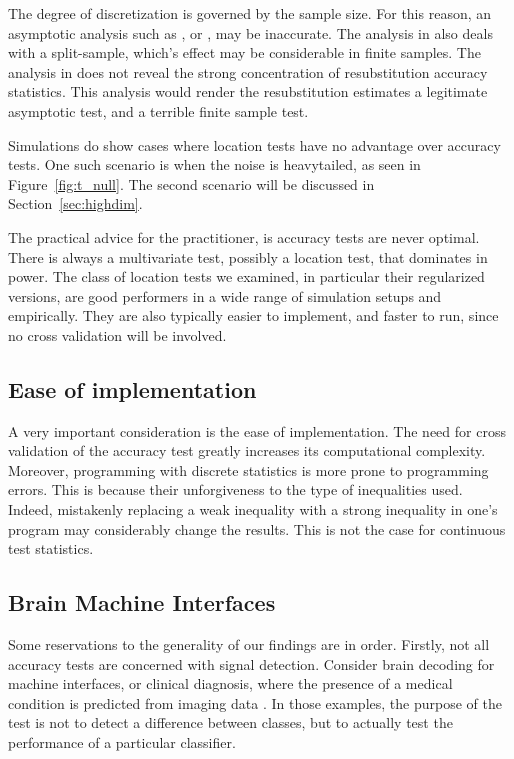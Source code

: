 \documentclass[12pt,a4paper]{article}
\begin{document}
The degree of discretization is governed by the sample size. 
For this reason, an asymptotic analysis such as \cite{ramdas_classification_2016}, or \cite{golland_permutation_2005}, may be inaccurate.
The analysis in \cite{ramdas_classification_2016} also deals with a split-sample, which's effect may be considerable in finite samples. 
The analysis in \cite{golland_permutation_2005} does not reveal the strong concentration of resubstitution accuracy statistics. This analysis would render the resubstitution estimates a legitimate asymptotic test, and a terrible finite sample test. 

Simulations do show cases where location tests have no advantage over accuracy tests. 
One such scenario is when the noise is heavytailed, as seen in Figure~\ref{fig:t_null}.
The second scenario will be discussed in Section~\ref{sec:highdim}.

The practical advice for the practitioner, is accuracy tests are never optimal. 
There is always a multivariate test, possibly a location test, that dominates in power. 
The class of location tests we examined, in particular their regularized versions, are good performers in a wide range of simulation setups and empirically. 
They are also typically easier to implement, and faster to run, since no cross validation will be involved. 



\subsection{Ease of implementation}
A very important consideration is the ease of implementation. 
The need for cross validation of the accuracy test greatly increases its computational complexity. 
Moreover, programming with discrete statistics is more prone to programming errors. 
This is because their unforgiveness to the type of inequalities used. 
Indeed, mistakenly replacing a weak inequality with a strong inequality in one's program may considerably change the results. 
This is not the case for continuous test statistics. 




\subsection{Brain Machine Interfaces}
\label{sec:reservations}

Some reservations to the generality of our findings are in order. 
Firstly, not all accuracy tests are concerned with signal detection.
Consider brain decoding for machine interfaces, or clinical diagnosis, where the presence of a medical condition is predicted from imaging data \citep[e.g.][]{olivetti_induction_2012,wager_fmri-based_2013}. 
In those examples, the purpose of the test is not to detect a difference between classes, but to actually test the performance of a particular classifier.  
\end{document}
